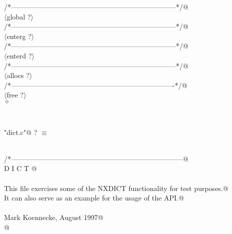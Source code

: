 \documentclass[12pt]{article}
\begin{document}
{\begin{flushleft}
\begin{minipage}{\linewidth}
\begin{list}{}{}
\mbox{}\verb@/*-----------------------------------------------------------------------*/@\\
\mbox{}\verb@@$\langle$global {\footnotesize ?}$\rangle$\verb@@\\
\mbox{}\verb@/*-----------------------------------------------------------------------*/@\\
\mbox{}\verb@@$\langle$enterg {\footnotesize ?}$\rangle$\verb@@\\
\mbox{}\verb@/*-----------------------------------------------------------------------*/@\\
\mbox{}\verb@@$\langle$enterd {\footnotesize ?}$\rangle$\verb@@\\
\mbox{}\verb@/*-----------------------------------------------------------------------*/@\\
\mbox{}\verb@@$\langle$allocs {\footnotesize ?}$\rangle$\verb@@\\
\mbox{}\verb@/*----------------------------------------------------------------------*/@\\
\mbox{}\verb@@$\langle$free {\footnotesize ?}$\rangle$\verb@@\\
\mbox{}\verb@@$\diamond$
\end{list}
\vspace{-2ex}
\end{minipage}\\[4ex]
\end{flushleft}
\begin{flushleft} \small
\begin{minipage}{\linewidth} \label{scrap43}
\verb@"dict.c"@ {\footnotesize ? }$\equiv$
\vspace{-1ex}
\begin{list}{}{} \item
\mbox{}\verb@@\\
\mbox{}\verb@/*--------------------------------------------------------------------------@\\
\mbox{}\verb@                               D I C T @\\
\mbox{}\verb@@\\
\mbox{}\verb@ This file exercises some of the NXDICT functionality for test purposes.@\\
\mbox{}\verb@ It can also serve as an example for the usage of the API.@\\
\mbox{}\verb@@\\
\mbox{}\verb@ Mark Koennecke, August 1997@\\
\mbox{}\verb@  @\\

\end{list}
\end{minipage}
\end{flushleft}}
\end{document}
